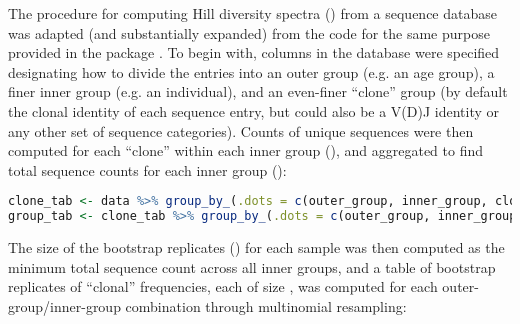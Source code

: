 The procedure for computing Hill diversity spectra () from a  sequence database was adapted (and substantially expanded) from the code for the same purpose provided in the  package  \parencite{gupta2015changeo,stern2014bcells}. To begin with, columns in the database were specified designating how to divide the entries into an outer group (e.g. an age group), a finer inner group (e.g. an individual), and an even-finer ``clone'' group (by default the clonal identity of each sequence entry, but could also be a V(D)J identity or any other set of sequence categories). Counts of unique sequences were then computed for each ``clone'' within each inner group (), and aggregated to find total sequence counts for each inner group ():

\begin{lstlisting}[language=R]
clone_tab <- data %>% group_by_(.dots = c(outer_group, inner_group, clone_field)) %>% dplyr::summarize(COUNT = n())
group_tab <- clone_tab %>% group_by_(.dots = c(outer_group, inner_group)) %>% dplyr::summarize_(SEQUENCES = interp(~sum(x, na.rm = TRUE), x = as.name("COUNT")))
\end{lstlisting}

\noindent The size of the bootstrap replicates () for each sample was then computed as the minimum total sequence count across all inner groups, and a table of  bootstrap replicates of ``clonal'' frequencies, each of size , was computed for each outer-group/inner-group combination through multinomial resampling:

